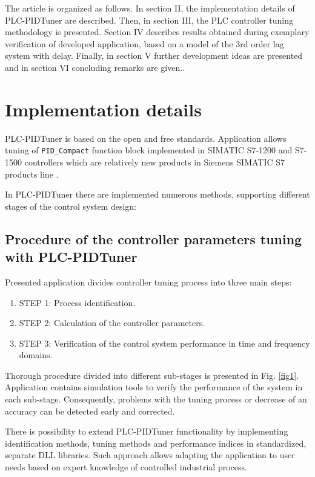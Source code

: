 \documentclass{amcs}
\begin{document}
The article is organized as follows. In section II, the implementation details of PLC-PIDTuner are described. Then, in section III, the PLC controller tuning methodology is presented. Section IV describes results obtained during exemplary verification of developed application, based on a model of the 3rd order lag system with delay. Finally, in section V further development ideas are presented and in section VI concluding remarks are given..

\section{Implementation details}
%
PLC-PIDTuner is based on the open and free standards. Application allows tuning of \texttt{PID\_Compact} function block implemented in SIMATIC S7-1200 and S7-1500 controllers which are relatively new products in Siemens SIMATIC S7 products line \cite{Mozaryn:2016}. 

In PLC-PIDTuner there are implemented numerous methods, supporting different stages of the control system design: 
%

\subsection{Procedure of the controller parameters tuning with PLC-PIDTuner}
Presented application  divides controller tuning process into three main steps:

\begin{enumerate}
	\item STEP 1: Process identification.
	\item STEP 2: Calculation of the controller parameters.
	\item STEP 3: Verification of the control system performance in time and frequency domains.
\end{enumerate}

Thorough procedure divided into different sub-stages is presented in Fig. \ref{fig1}. Application contains simulation tools to verify the performance of the system in each sub-stage. Consequently, problems with the tuning process or decrease of an accuracy can be detected early and corrected. 

There is possibility to extend PLC-PIDTuner functionality by implementing identification methods, tuning methods and performance indices in standardized, separate DLL libraries. Such approach allows adapting the application to user needs based on expert knowledge of controlled industrial process. 
\end{document}
